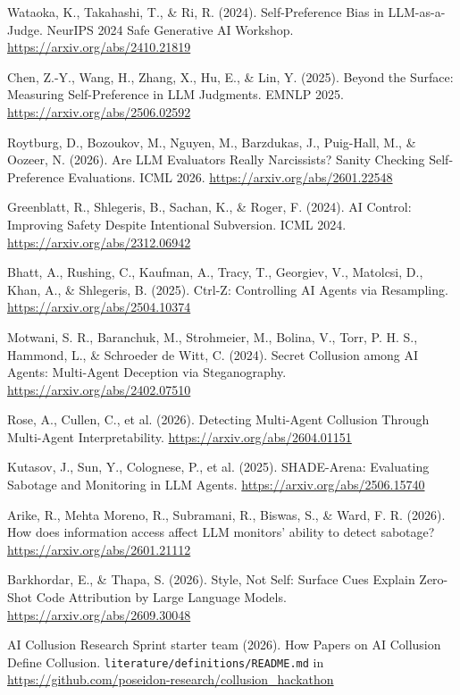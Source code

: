 \documentclass[11pt,letterpaper]{article}
\begin{document}
\begin{enumerate}[label={[\arabic*]},leftmargin=2.2em,itemsep=1pt]
\item Wataoka, K., Takahashi, T., \& Ri, R. (2024). Self-Preference Bias in LLM-as-a-Judge. NeurIPS 2024 Safe Generative AI Workshop. \url{https://arxiv.org/abs/2410.21819}
\item Chen, Z.-Y., Wang, H., Zhang, X., Hu, E., \& Lin, Y. (2025). Beyond the Surface: Measuring Self-Preference in LLM Judgments. EMNLP 2025. \url{https://arxiv.org/abs/2506.02592}
\item Roytburg, D., Bozoukov, M., Nguyen, M., Barzdukas, J., Puig-Hall, M., \& Oozeer, N. (2026). Are LLM Evaluators Really Narcissists? Sanity Checking Self-Preference Evaluations. ICML 2026. \url{https://arxiv.org/abs/2601.22548}
\item Greenblatt, R., Shlegeris, B., Sachan, K., \& Roger, F. (2024). AI Control: Improving Safety Despite Intentional Subversion. ICML 2024. \url{https://arxiv.org/abs/2312.06942}
\item Bhatt, A., Rushing, C., Kaufman, A., Tracy, T., Georgiev, V., Matolcsi, D., Khan, A., \& Shlegeris, B. (2025). Ctrl-Z: Controlling AI Agents via Resampling. \url{https://arxiv.org/abs/2504.10374}
\item Motwani, S. R., Baranchuk, M., Strohmeier, M., Bolina, V., Torr, P. H. S., Hammond, L., \& Schroeder de Witt, C. (2024). Secret Collusion among AI Agents: Multi-Agent Deception via Steganography. \url{https://arxiv.org/abs/2402.07510}
\item Rose, A., Cullen, C., et al. (2026). Detecting Multi-Agent Collusion Through Multi-Agent Interpretability. \url{https://arxiv.org/abs/2604.01151}
\item Kutasov, J., Sun, Y., Colognese, P., et al. (2025). SHADE-Arena: Evaluating Sabotage and Monitoring in LLM Agents. \url{https://arxiv.org/abs/2506.15740}
\item Arike, R., Mehta Moreno, R., Subramani, R., Biswas, S., \& Ward, F. R. (2026). How does information access affect LLM monitors' ability to detect sabotage? \url{https://arxiv.org/abs/2601.21112}
\item Barkhordar, E., \& Thapa, S. (2026). Style, Not Self: Surface Cues Explain Zero-Shot Code Attribution by Large Language Models. \url{https://arxiv.org/abs/2609.30048}
\item AI Collusion Research Sprint starter team (2026). How Papers on AI Collusion Define Collusion. \texttt{literature/definitions/README.md} in \url{https://github.com/poseidon-research/collusion_hackathon}
\end{enumerate}
\normalsize
\end{document}
